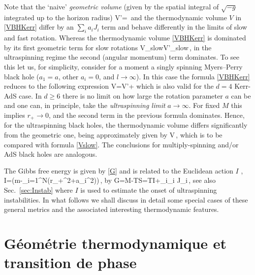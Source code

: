 Note that the `naive' {\em geometric volume} \cite{Parikh:2006, BallikLake:2010, CveticEtal:2010,BallikLake:2013} (given by the spatial integral of $\sqrt{-g}$ integrated up to the horizon radius) 
\be
V'=\,
\ee
and the thermodynamic volume $V$ in \eqref{VBHKerr} differ by an $\sum_i a_iJ_i$ term and behave differently in the limits of slow and fast rotation. 
Whereas the thermodynamic volume \eqref{VBHKerr} is dominated by its first geometric term for slow rotations 
\be\label{Vslow}
V_{\mbox{\tiny  slow}}\approx V'_{\mbox{\tiny  slow}}\approx{}\,,
\ee
in the ultraspinning regime the second (angular momentum) term dominates.
To see this let us, for simplicity, consider for a moment 
a singly spinning Myers--Perry black hole ($a_1=a$, other $a_i=0$, and $l\to \infty$). 
In this case the formula \eqref{VBHKerr} reduces to  the following expression 
\be\label{VKerr}
V=V'+
\ee
which is also valid for the $d=4$ Kerr-AdS case.
In $d\geq 6$ there is no limit on how large the rotation parameter $a$ can be \cite{EmparanMyers:2003} and one can, in principle, take the {\em ultraspinning limit} $a\to \infty$. For fixed $M$ this implies $r_+\to 0$, and the second term in the previous formula dominates.
Hence, for the ultraspinning black holes, the thermodynamic volume differs significantly from the geometric one, being approximately given by
\be\label{VeqV'}
V\approx {}\approx {}\,,
\ee
which is to be compared with formula \eqref{Vslow}. The conclusions for multiply-spinning and/or AdS black holes are   analogous.

The Gibbs free energy is given by \eqref{G} and is related to the Euclidean action $I$ \cite{Gibbons:2004ai},  
\be\label{action}
I=\Bigl(m-\prod_{i=1}^N(r_+^2+a_i^2)\Bigr)\,,
\ee
by 
\be\label{GibbsKerrAdS}
G=M-TS=TI+\sum_{i}\Omega_i J_i\,,
\ee
see also Sec.~\ref{sec:Instab} where $I$ is used to estimate the onset of ultraspinning instabilities.  
In what follows we shall discuss in detail some special cases of these general metrics and the associated interesting thermodynamic features.


\section {Géométrie thermodynamique et transition de phase}

